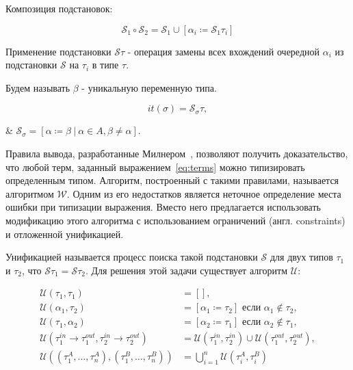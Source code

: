 Композиция подстановок:

\begin{equation}
    \label{eq:subst_comp}
    \mathcal{S}_1 \circ \mathcal{S}_2 = \mathcal{S}_1 \cup \left[ \alpha_i \coloneqq \mathcal{S}_1 \tau_i \right]
\end{equation}

Применение подстановки $\mathcal{S} \tau$ - операция замены всех вхождений очередной $\alpha_i$ из подстановки $\mathcal{S}$ на $\tau_i$ в типе $\tau$.

Будем называть $\beta$ - уникальную переменную типа.

\begin{equation}
    \label{eq:instantiate}
    it(\sigma) = \mathcal{S}_{\sigma} \tau,
\end{equation}
\begin{eqrem}
    & $\mathcal{S}_\sigma = \left[ \alpha \coloneqq \beta ~|~ \alpha \in A, \beta \ne \alpha \right]$.\\
\end{eqrem}

Правила вывода, разработанные Милнером~\cite{UrbanN2009}, позволяют получить доказательство, что любой терм, заданный выражением~\eqref{eq:terms} можно типизировать определенным типом.
Алгоритм, построенный с такими правилами, называется алгоритмом $\mathcal{W}$.
Одним из его недостатков является неточное определение места ошибки при типизации выражения.
Вместо него предлагается использовать модификацию этого алгоритма с использованием ограничений (англ. constraints) и отложенной унификацией.

Унификацией называется процесс поиска такой подстановки $\mathcal{S}$ для двух типов $\tau_1$ и $\tau_2$, что $\mathcal{S} \tau_1 = \mathcal{S} \tau_2$.
Для решения этой задачи существует алгоритм $\mathcal{U}$:

\begin{equation}
    \label{eq:algo_u}
    \begin{aligned}
        \mathcal{U}(\tau_1, \tau_1) &= \left[  \right], \\
        \mathcal{U}(\alpha_1, \tau_2) &= \left[ \alpha_1 \coloneqq \tau_2 \right] \text{ если } \alpha_1 \notin \tau_2, \\
        \mathcal{U}(\tau_1, \alpha_2) &= \left[ \alpha_2 \coloneqq \tau_1 \right] \text{ если } \alpha_2 \notin \tau_1, \\
        \mathcal{U}(\tau^{in}_1 \to \tau^{out}_1, \tau^{in}_2 \to \tau^{out}_2) &= \mathcal{U}(\tau^{in}_1, \tau^{in}_2) \cup \mathcal{U}(\tau^{out}_1, \tau^{out}_2), \\
        \mathcal{U}((\tau_1^A, \ldots, \tau_n^A), (\tau_1^B, \ldots, \tau_n^B)) &= \bigcup_{i = 1}^{n} \mathcal{U}(\tau_i^A, \tau_i^B)
    \end{aligned}
\end{equation}


